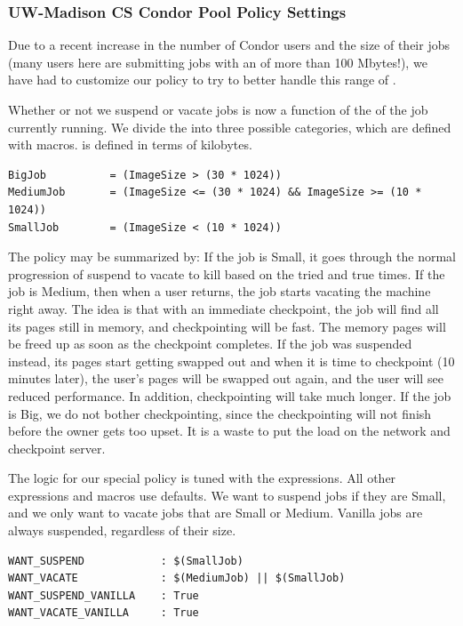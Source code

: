 \subsubsection{\label{sec:UW-Policy}
UW-Madison CS Condor Pool Policy Settings} 

Due to a recent increase in the number of Condor users and the size of
their jobs (many users here are submitting jobs with an
 of more than 100 Mbytes!), we have had to customize our
policy to try to better handle this range of .

Whether or not we suspend or vacate jobs is now a function
of the  of the job currently running.
We divide the 
into three possible categories, which are defined with macros.
 is defined in terms of kilobytes.
\begin{verbatim}
BigJob          = (ImageSize > (30 * 1024))
MediumJob       = (ImageSize <= (30 * 1024) && ImageSize >= (10 * 1024))
SmallJob        = (ImageSize < (10 * 1024))
\end{verbatim}

The policy may be summarized by: If the
job is Small, it goes through the normal progression of suspend to
vacate to kill based on the tried and true times.
If the job is Medium, then when a user returns,
the job starts vacating the machine right away.
The idea is that 
with an immediate checkpoint, the job will find all its pages
still in memory, and checkpointing will be fast.
The memory pages will be freed up as soon as the checkpoint completes.
If the job was suspended instead, its pages
start getting swapped out and when it is time to checkpoint (10
minutes later), the user's pages will be swapped out
again, and the user will see reduced performance.
In addition, checkpointing will take much longer.
If the job is Big, we do not bother checkpointing,
since the checkpointing will not finish before the owner
gets too upset.
It is a waste to
put the load on the network and checkpoint server.

The logic for our special policy is tuned with the
 expressions. 
All other expressions and macros use defaults.
We want to suspend jobs if they are Small, and we only want
to vacate jobs that are Small or Medium.  
Vanilla jobs are always suspended, regardless of their size.
\begin{verbatim}
WANT_SUSPEND            : $(SmallJob)
WANT_VACATE             : $(MediumJob) || $(SmallJob)
WANT_SUSPEND_VANILLA    : True
WANT_VACATE_VANILLA     : True
\end{verbatim}

